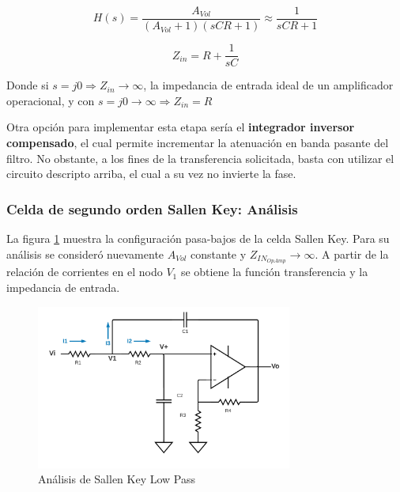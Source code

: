 \begin{equation}
        H(s) = \frac{A_{Vol}}{(A_{Vol}+1)(sCR + 1)} \approx \frac{1}{sCR + 1}
    \label{eq:SK6}
\end{equation}

\begin{equation}
        Z_{in} = R + \frac{1}{sC} 
    \label{eq:SK7}
\end{equation}

Donde si $s = j0 \Rightarrow Z_{in} \rightarrow  \infty$, la impedancia de entrada ideal de un amplificador operacional, y con $s = j0 \rightarrow \infty \Rightarrow Z_{in} = R$

Otra opción para implementar esta etapa sería el \textbf{integrador inversor compensado}, el cual permite incrementar la atenuación en banda pasante del filtro. No obstante, a los fines de la transferencia solicitada, basta con utilizar el circuito descripto arriba, el cual a su vez no invierte la fase. 

\subsubsection{Celda de segundo orden Sallen Key: Análisis}

La figura \ref{fig:SK_H} muestra la configuración pasa-bajos de la celda Sallen Key. Para su análisis se consideró nuevamente $A_{Vol}$ constante y $Z_{IN_{OpAmp}}\rightarrow \infty$. A partir de la relación de corrientes en el nodo $V_{1}$ se obtiene la función transferencia y la impedancia de entrada.

\begin{figure}[H]
    \centering
    \includegraphics[width= 0.75\textwidth]{../Ejercicio2-DisenoDeCeldas/1CeldaSallenKey/images/SallenKeyH.png}
    \caption{Análisis de Sallen Key Low Pass}
    \label{fig:SK_H}
\end{figure}

